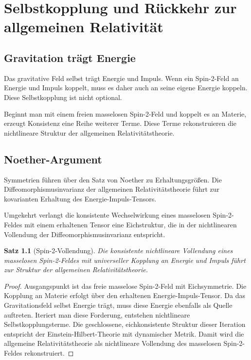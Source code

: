\documentclass[11pt,a4paper]{book}
\newtheorem{satz}{Satz}[chapter]
\theoremstyle{remark}
\begin{document}
\chapter{Selbstkopplung und Rückkehr zur allgemeinen Relativität}
\section{Gravitation trägt Energie}
Das gravitative Feld selbst trägt Energie und Impuls. Wenn ein Spin-2-Feld an Energie und Impuls koppelt, muss es daher auch an seine eigene Energie koppeln. Diese Selbstkopplung ist nicht optional.

Beginnt man mit einem freien masselosen Spin-2-Feld und koppelt es an Materie, erzeugt Konsistenz eine Reihe weiterer Terme. Diese Terme rekonstruieren die nichtlineare Struktur der allgemeinen Relativitätstheorie.

\section{Noether-Argument}
Symmetrien führen über den Satz von Noether zu Erhaltungsgrößen. Die Diffeomorphismusinvarianz der allgemeinen Relativitätstheorie führt zur kovarianten Erhaltung des Energie-Impuls-Tensors.

Umgekehrt verlangt die konsistente Wechselwirkung eines masselosen Spin-2-Feldes mit einem erhaltenen Tensor eine Eichstruktur, die in der nichtlinearen Vollendung der Diffeomorphismusinvarianz entspricht.

\begin{satz}[Spin-2-Vollendung]
Die konsistente nichtlineare Vollendung eines masselosen Spin-2-Feldes mit universeller Kopplung an Energie und Impuls führt zur Struktur der allgemeinen Relativitätstheorie.
\end{satz}

\begin{proof}
Ausgangspunkt ist das freie masselose Spin-2-Feld mit Eichsymmetrie. Die Kopplung an Materie erfolgt über den erhaltenen Energie-Impuls-Tensor. Da das Gravitationsfeld selbst Energie trägt, muss diese Energie ebenfalls als Quelle auftreten. Iteriert man diese Forderung, entstehen nichtlineare Selbstkopplungsterme. Die geschlossene, eichkonsistente Struktur dieser Iteration entspricht der Einstein-Hilbert-Theorie mit dynamischer Metrik. Damit wird die allgemeine Relativitätstheorie als nichtlineare Vollendung des masselosen Spin-2-Feldes rekonstruiert.
\end{proof}
\end{document}
